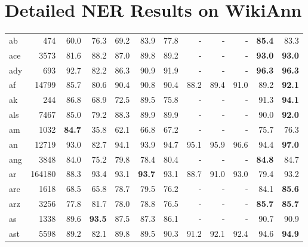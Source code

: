 \documentclass[11pt,a4paper]{article}
\begin{document}
\section{Detailed NER Results on WikiAnn}
\label{sec:detailer-ner-results}
\tiny
\centering
{}
\tabletail{\bottomrule}
\begin{supertabular}{lrrr|rrr|rrr|rr}
ab & 474 & 60.0 & 76.3 & 69.2 & 83.9 & 77.8 & - & - & - & \textbf{85.4} & 83.3\\
ace & 3573 & 81.6 & 88.2 & 87.0 & 89.8 & 89.2 & - & - & - & \textbf{93.0} & \textbf{93.0}\\
ady & 693 & 92.7 & 82.2 & 86.3 & 90.9 & 91.9 & - & - & - & \textbf{96.3} & \textbf{96.3}\\
af & 14799 & 85.7 & 80.6 & 90.4 & 90.8 & 90.4 & 88.2 & 89.4 & 91.0 & 89.2 & \textbf{92.1}\\
ak & 244 & 86.8 & 68.9 & 72.5 & 89.5 & 75.8 & - & - & - & 91.3 & \textbf{94.1}\\
als & 7467 & 85.0 & 79.2 & 88.3 & 89.9 & 89.9 & - & - & - & 90.0 & \textbf{92.0}\\
am & 1032 & \textbf{84.7} & 35.8 & 62.1 & 66.8 & 67.2 & - & - & - & 75.7 & 76.3\\
an & 12719 & 93.0 & 82.7 & 94.1 & 93.9 & 94.7 & 95.1 & 95.9 & 96.6 & 94.4 & \textbf{97.0}\\
ang & 3848 & 84.0 & 75.2 & 79.8 & 78.4 & 80.4 & - & - & - & \textbf{84.8} & 84.7\\
ar & 164180 & 88.3 & 93.4 & 93.1 & \textbf{93.7} & 93.1 & 88.7 & 91.0 & 93.0 & 79.4 & 93.2\\
arc & 1618 & 68.5 & 65.8 & 78.7 & 79.5 & 76.2 & - & - & - & 84.1 & \textbf{85.6}\\
arz & 3256 & 77.8 & 81.7 & 78.0 & 78.8 & 76.5 & - & - & - & \textbf{85.7} & \textbf{85.7}\\
as & 1338 & 89.6 & \textbf{93.5} & 87.5 & 87.3 & 86.1 & - & - & - & 90.7 & 90.9\\
ast & 5598 & 89.2 & 82.1 & 89.8 & 89.5 & 90.3 & 91.2 & 92.1 & 92.4 & 94.6 & \textbf{94.9}\\

\end{supertabular}
\end{document}
